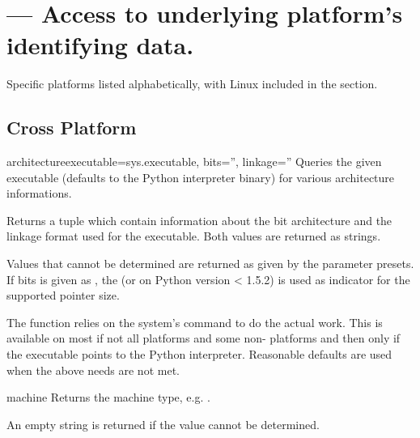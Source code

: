 \section{ --- 
   Access to underlying platform's identifying data.}



\begin{notice}[note]
	Specific platforms listed alphabetically, with Linux included in the \UNIX
	section.
\end{notice}

\subsection{Cross Platform}

\begin{funcdesc}{architecture}{executable=sys.executable, bits='', linkage=''}
  Queries the given executable (defaults to the Python interpreter
  binary) for various architecture informations.

  Returns a tuple  which contain information about
  the bit architecture and the linkage format used for the
  executable. Both values are returned as strings.

  Values that cannot be determined are returned as given by the
  parameter presets. If bits is given as , the
  (or  on Python version < 1.5.2) is used as
  indicator for the supported pointer size.

  The function relies on the system's  command to do the
  actual work. This is available on most if not all \UNIX{} 
  platforms and some non-\UNIX{} platforms and then only if the
  executable points to the Python interpreter.  Reasonable defaults
  are used when the above needs are not met.
\end{funcdesc}

\begin{funcdesc}{machine}{}
  Returns the machine type, e.g. .

  An empty string is returned if the value cannot be determined.
\end{funcdesc}

